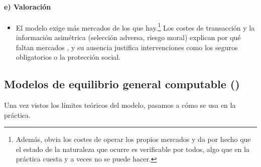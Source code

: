 \documentclass[11pt]{article}
\begin{document}
\paragraph{e) Valoración}

\begin{itemize}
\item El modelo exige más mercados de los que hay.\footnote{Además, obvia los costes de operar los propios mercados y da por hecho que el estado de la naturaleza que ocurre es verificable por todos, algo que en la práctica cuesta y a veces no se puede hacer.} Los costes de transacción y la información asimétrica (selección adversa, riesgo moral) explican por qué faltan mercados\nocite{Arrow1963Uncertainty} , y su ausencia justifica intervenciones como los seguros obligatorios o la protección social.
\end{itemize}

\subsection{Modelos de equilibrio general computable ()}\label{sec:modelos-equilibrio-general}

Una vez vistos los límites teóricos del modelo, pasamos a cómo se usa en la práctica.
\end{document}
